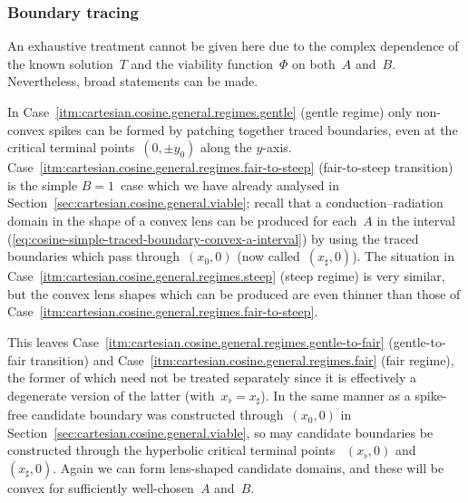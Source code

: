 \subsubsection{Boundary tracing}
\label{sec:cartesian.cosine.general.tracing}

An exhaustive treatment cannot be given here
due to the complex dependence
of the known solution~$T$ and the viability function~$\Phi$
on both~$A$ and~$B$.
Nevertheless, broad statements can be made.

\begin{figure}
\end{figure}

In Case~\ref{itm:cartesian.cosine.general.regimes.gentle} (gentle regime)
only non-convex spikes can be formed
by patching together traced boundaries,
even at the critical terminal points~$(0, \pm y_0)$ along the $y$-axis.
Case~\ref{itm:cartesian.cosine.general.regimes.fair-to-steep}
  (fair-to-steep transition)
is the simple $B = 1$~case which we have already analysed
in Section~\ref{sec:cartesian.cosine.general.viable};
recall that a conduction--radiation domain in the shape of a convex lens
can be produced for each~$A$ in the interval~%
  (\ref{eq:cosine-simple-traced-boundary-convex-a-interval})
by using the traced boundaries which pass through~$(x_0, 0)$
(now called~$(x_\sharp, 0)$).
The situation in
Case~\ref{itm:cartesian.cosine.general.regimes.steep} (steep regime)
is very similar,
but the convex lens shapes which can be produced
are even thinner than those of
Case~\ref{itm:cartesian.cosine.general.regimes.fair-to-steep}.

This leaves
Case~\ref{itm:cartesian.cosine.general.regimes.gentle-to-fair}
  (gentle-to-fair transition)
and
Case~\ref{itm:cartesian.cosine.general.regimes.fair} (fair regime),
the former of which need not be treated separately
since it is effectively a degenerate version of the latter
(with~$x_\flat = x_\sharp$).
In the same manner as a spike-free candidate boundary
was constructed through~$(x_0, 0)$
in Section~\ref{sec:cartesian.cosine.general.viable},
so may candidate boundaries be constructed
through the hyperbolic critical terminal points~%
  $(x_\flat, 0)$ and~$(x_\sharp, 0)$.
Again we can form lens-shaped candidate domains,
and these will be convex for sufficiently well-chosen~$A$ and~$B$.

